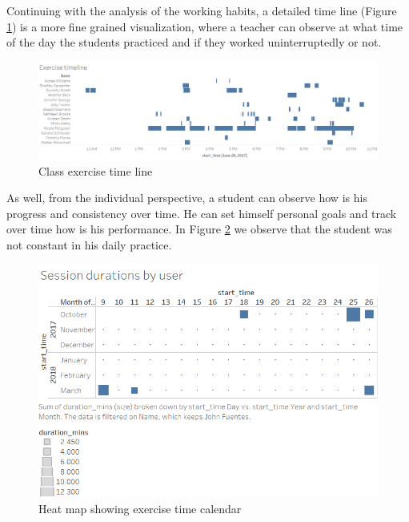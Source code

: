 Continuing with the analysis of the working habits, a detailed time line (Figure \ref{fig:Exercise_timeline}) is a more fine grained visualization, where a teacher can observe at what time of the day the students practiced and if they worked uninterruptedly or not.

\begin{figure}[!h]
	\centering
	\includegraphics[width=1\linewidth]{gfx/Exercise_timeline}
	\caption{Class exercise time line}
	\label{fig:Exercise_timeline}
\end{figure}

As well, from the individual perspective, a student can observe how is his progress and consistency over time. He can set himself personal goals and track over time how is his performance. In Figure \ref{fig:Session_durations_by_user} we observe that the student was not constant in his daily practice.

\begin{figure}[!h]
	\centering
	\includegraphics[width=1\linewidth]{gfx/Session_durations_by_user}
	\caption{Heat map showing exercise time calendar}
	\label{fig:Session_durations_by_user}
\end{figure}
